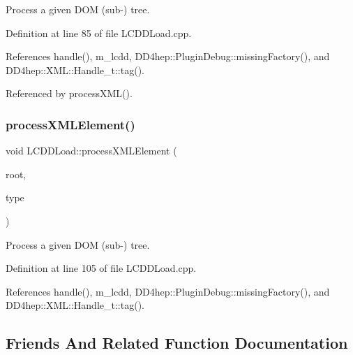 Process a given D\+OM (sub-\/) tree. 



Definition at line 85 of file L\+C\+D\+D\+Load.\+cpp.



References handle(), m\+\_\+lcdd, D\+D4hep\+::\+Plugin\+Debug\+::missing\+Factory(), and D\+D4hep\+::\+X\+M\+L\+::\+Handle\+\_\+t\+::tag().



Referenced by process\+X\+M\+L().

\hypertarget{class_d_d4hep_1_1_l_c_d_d_load_a6273870262bd0bd4102b546c1ef9d04d}{}\label{class_d_d4hep_1_1_l_c_d_d_load_a6273870262bd0bd4102b546c1ef9d04d} 
\subsubsection{\texorpdfstring{process\+X\+M\+L\+Element()}{processXMLElement()}\hspace{0.1cm}{\footnotesize\ttfamily [2/2]}}
{\footnotesize\ttfamily void L\+C\+D\+D\+Load\+::process\+X\+M\+L\+Element (\begin{DoxyParamCaption}\item[{const \hyperlink{class_d_d4hep_1_1_x_m_l_1_1_handle__t}{X\+M\+L\+::\+Handle\+\_\+t} \&}]{root,  }\item[{\hyperlink{namespace_d_d4hep_acafe43ba4537ab6e999e808142965fab}{L\+C\+D\+D\+Build\+Type}}]{type }\end{DoxyParamCaption})\hspace{0.3cm}{\ttfamily [virtual]}}



Process a given D\+OM (sub-\/) tree. 



Definition at line 105 of file L\+C\+D\+D\+Load.\+cpp.



References handle(), m\+\_\+lcdd, D\+D4hep\+::\+Plugin\+Debug\+::missing\+Factory(), and D\+D4hep\+::\+X\+M\+L\+::\+Handle\+\_\+t\+::tag().



\subsection{Friends And Related Function Documentation}
\hypertarget{class_d_d4hep_1_1_l_c_d_d_load_a6ad008feefc2e21d2190b244a0c96961}{}\label{class_d_d4hep_1_1_l_c_d_d_load_a6ad008feefc2e21d2190b244a0c96961} 

